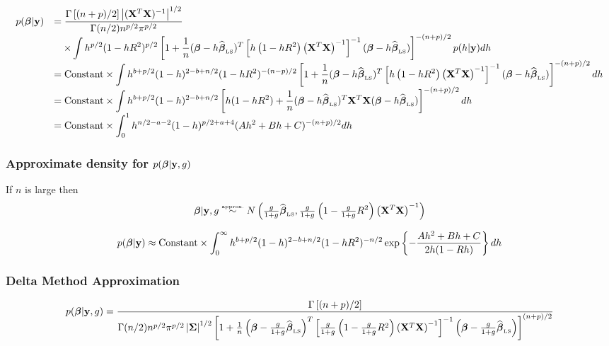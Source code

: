 \documentclass{article}
\def\vectorfontone{\bf}
\def\vectorfonttwo{\boldsymbol}
\def\vy{{\vectorfontone y}}                      %
\def\vbeta{{\vectorfonttwo \beta}}               %
\def\matrixfontone{\bf}
\def\mX{{\matrixfontone X}}                      %
\def\ds{\displaystyle}
\theoremstyle{definition}
\begin{document}
$$
\begin{array}{rl}
p(\vbeta|\vy) 
    & \ds 
    = \frac{\Gamma\left[(n+p)/2\right] \left|  (\mX^T\mX) ^{-1} \right|^{1/2}}{\Gamma(n/2)n^{p/2}\pi^{p/2}}
    \\
    & \ds \quad \times \int 
h^{p/2} ( 
1 -
h R^2)^{p/2}
\left[1+\frac{1}{n}(\vbeta-h\widehat{\vbeta}_{\mbox{\tiny LS}})^T\left[ h \left( 
	1 -
	h R^2\right)  \left( \mX^T\mX \right)^{-1} \right]^{-1}(\vbeta-h\widehat{\vbeta}_{\mbox{\tiny LS}})\right]^{-(n+p)/2} p(h|\vy)dh
	\\
	& \ds 
	= \mbox{Constant} \times \int 
	h^{b+p/2}(1 - h)^{2 - b + n/2} ( 
	1 -
	h R^2)^{-(n-p)/2}
	    \left[1+\frac{1}{n}(\vbeta-h\widehat{\vbeta}_{\mbox{\tiny LS}})^T\left[ h \left( 
	    1 -
	    h R^2\right)  \left( \mX^T\mX \right)^{-1} \right]^{-1}(\vbeta-h\widehat{\vbeta}_{\mbox{\tiny LS}})\right]^{-(n+p)/2}dh
	    
	\\
	& \ds 
	= \mbox{Constant} \times \int 
	h^{b+p/2}(1 - h)^{2 - b + n/2} 
	\left[ h(1 -h R^2) +\frac{1}{n}(\vbeta-h\widehat{\vbeta}_{\mbox{\tiny LS}})^T\mX^T\mX (\vbeta-h\widehat{\vbeta}_{\mbox{\tiny LS}})\right]^{-(n+p)/2}dh  
		
	\\  
	& \ds 
	= \mbox{Constant} \times \int_0^1
	h^{n/2 - a - 2}(1 - h)^{p/2 + a + 4} (Ah^2 + Bh + C)^{-(n+p)/2}dh  
\end{array}
$$

\subsubsection{Approximate density for $p(\vbeta|\vy,g)$}

If $n$ is large then
$$
\vbeta|\vy,g \stackrel{\mbox{\tiny approx.}}{\sim} N\left( \tfrac{g}{1+g}\widehat{\vbeta}_{\mbox{\tiny LS}},  \tfrac{g}{1+g} \left( 
1 -
\tfrac{g}{1+g} R^2\right)  \left( \mX^T\mX \right)^{-1} \right)
$$

$$
\ds p(\vbeta|\vy) \approx \mbox{Constant} 
\times \int_0^\infty h^{b+p/2}(1 - h)^{2-b+n/2}  (1  - h R^2)^{-n/2} \exp\left\{  
-\frac{Ah^2 + Bh + C}{2h(1-Rh)} 
\right\} dh
$$


\subsubsection{Delta Method Approximation}


$$
p(\vbeta|\vy,g) = \frac{\Gamma\left[(n+p)/2\right]}{\Gamma(n/2)n^{p/2}\pi^{p/2}\left|{\boldsymbol\Sigma}\right|^{1/2}\left[1+\frac{1}{n}\left(\vbeta-\tfrac{g}{1+g}\widehat{\vbeta}_{\mbox{\tiny LS}}\right)^T\left[ \tfrac{g}{1+g} \left( 
	1 -
	\tfrac{g}{1+g} R^2\right)  \left( \mX^T\mX \right)^{-1} \right]^{-1}\left(\vbeta-\tfrac{g}{1+g}\widehat{\vbeta}_{\mbox{\tiny LS}}\right)\right]^{(n+p)/2}}
$$
\end{document}
